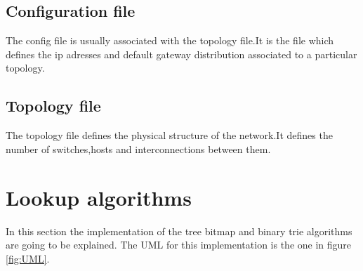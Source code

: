 \documentclass[]{report}
\begin{document}
\subsection{Configuration file}

The config file is usually associated with the topology file.It is the file which defines the ip adresses and default gateway distribution associated to a particular topology.

\subsection{Topology file}

The topology file defines the physical structure of the network.It defines the number of switches,hosts and interconnections between them.

\section{Lookup algorithms}
In this section the implementation of the tree bitmap and binary trie algorithms are going to be explained. The UML for this implementation is the one in figure \ref{fig:UML}.

\begin{minipage}{\linewidth}%

\label{fig:UML}
\end{minipage}
\end{document}
